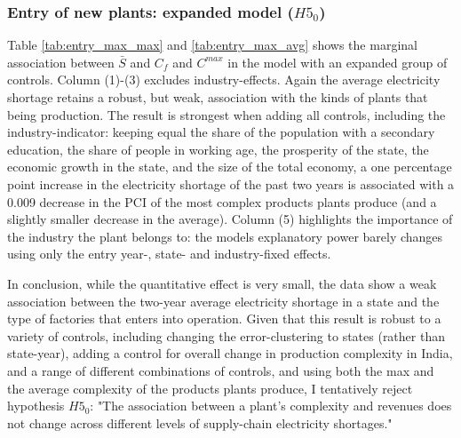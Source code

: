 \documentclass[11pt]{article}
\begin{document}
\subsubsection{Entry of new plants: expanded model ($H5_0$)}
 Table \ref{tab:entry_max_max} and \ref{tab:entry_max_avg} shows the marginal association between $\bar{S}$ and $C_f$ and $C^{max}$ in the model with an expanded group of controls. Column (1)-(3) excludes industry-effects. Again the average electricity shortage retains a robust, but weak, association with the kinds of plants that being production. The result is strongest when adding all controls, including the industry-indicator: keeping equal the share of the population with a secondary education, the share of people in working age, the prosperity of the state, the economic growth in the state, and the size of the total economy, a one percentage point increase in the electricity shortage of the past two years is associated with a 0.009 decrease in the PCI of the most complex products plants produce (and a slightly smaller decrease in the average). Column (5) highlights the importance of the industry the plant belongs to: the models explanatory power barely changes using only the entry year-, state- and industry-fixed effects.

In conclusion, while the quantitative effect is very small, the data show a weak association between the two-year average electricity shortage in a state and the type of factories that enters into operation. Given that this result is robust to a variety of controls, including changing the error-clustering to states (rather than state-year), adding a control for overall change in production complexity in India, and a range of different combinations of controls, and using both the max and the average complexity of the products plants produce, I tentatively reject hypothesis $H5_0$: "The association between a plant's complexity and revenues does not change across different levels of supply-chain electricity shortages."
\end{document}
